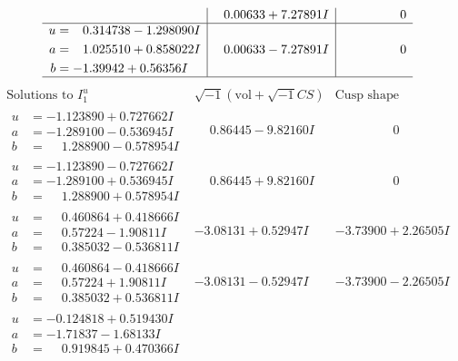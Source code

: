 \documentclass[1p]{elsarticle_modified}
\theoremstyle{definition}
\newcommand{\I}{\sqrt{-1}}
\begin{document}
$$\begin{array}{c|c|c}
 & \phantom{-}0.00633 + 7.27891 I & \phantom{-0.000000 } 0 \\ \hline\begin{aligned}
u &= \phantom{-}0.314738 - 1.298090 I \\
a &= \phantom{-}1.025510 + 0.858022 I \\
b &= -1.39942 + 0.56356 I\end{aligned}
 & \phantom{-}0.00633 - 7.27891 I & \phantom{-0.000000 } 0\\
 \hline 
 \end{array}$$\newpage$$\begin{array}{c|c|c}  
\text{Solutions to }I^u_{1}& \I (\text{vol} + \sqrt{-1}CS) & \text{Cusp shape}\\
 \hline 
\begin{aligned}
u &= -1.123890 + 0.727662 I \\
a &= -1.289100 - 0.536945 I \\
b &= \phantom{-}1.288900 - 0.578954 I\end{aligned}
 & \phantom{-}0.86445 - 9.82160 I & \phantom{-0.000000 } 0 \\ \hline\begin{aligned}
u &= -1.123890 - 0.727662 I \\
a &= -1.289100 + 0.536945 I \\
b &= \phantom{-}1.288900 + 0.578954 I\end{aligned}
 & \phantom{-}0.86445 + 9.82160 I & \phantom{-0.000000 } 0 \\ \hline\begin{aligned}
u &= \phantom{-}0.460864 + 0.418666 I \\
a &= \phantom{-}0.57224 - 1.90811 I \\
b &= \phantom{-}0.385032 - 0.536811 I\end{aligned}
 & -3.08131 + 0.52947 I & -3.73900 + 2.26505 I \\ \hline\begin{aligned}
u &= \phantom{-}0.460864 - 0.418666 I \\
a &= \phantom{-}0.57224 + 1.90811 I \\
b &= \phantom{-}0.385032 + 0.536811 I\end{aligned}
 & -3.08131 - 0.52947 I & -3.73900 - 2.26505 I \\ \hline\begin{aligned}
u &= -0.124818 + 0.519430 I \\
a &= -1.71837 - 1.68133 I \\
b &= \phantom{-}0.919845 + 0.470366 I\end{aligned}

\end{array}$$
\end{document}
